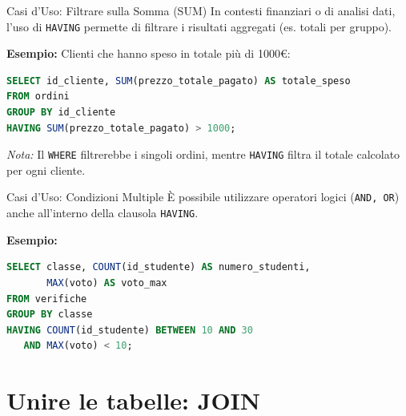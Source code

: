 \documentclass{beamer}
\begin{document}
\begin{frame}[fragile]{Casi d'Uso: Filtrare sulla Somma (SUM)}
In contesti finanziari o di analisi dati, l'uso di \texttt{HAVING} permette di filtrare i risultati aggregati (es. totali per gruppo).

\medskip
\textbf{Esempio:} Clienti che hanno speso in totale più di 1000€:

\begin{lstlisting}[language=SQL]
SELECT id_cliente, SUM(prezzo_totale_pagato) AS totale_speso
FROM ordini
GROUP BY id_cliente
HAVING SUM(prezzo_totale_pagato) > 1000;
\end{lstlisting}

\medskip
\textit{Nota:} Il \texttt{WHERE} filtrerebbe i singoli ordini, mentre \texttt{HAVING} filtra il totale calcolato per ogni cliente.
\end{frame}

\begin{frame}[fragile]{Casi d'Uso: Condizioni Multiple}
È possibile utilizzare operatori logici (\texttt{AND, OR}) anche all'interno della clausola \texttt{HAVING}.

\medskip
\textbf{Esempio:}
\begin{lstlisting}[language=SQL]
SELECT classe, COUNT(id_studente) AS numero_studenti,
       MAX(voto) AS voto_max
FROM verifiche
GROUP BY classe
HAVING COUNT(id_studente) BETWEEN 10 AND 30
   AND MAX(voto) < 10;
\end{lstlisting}
\end{frame}

\section{Unire le tabelle: JOIN}
\end{document}
